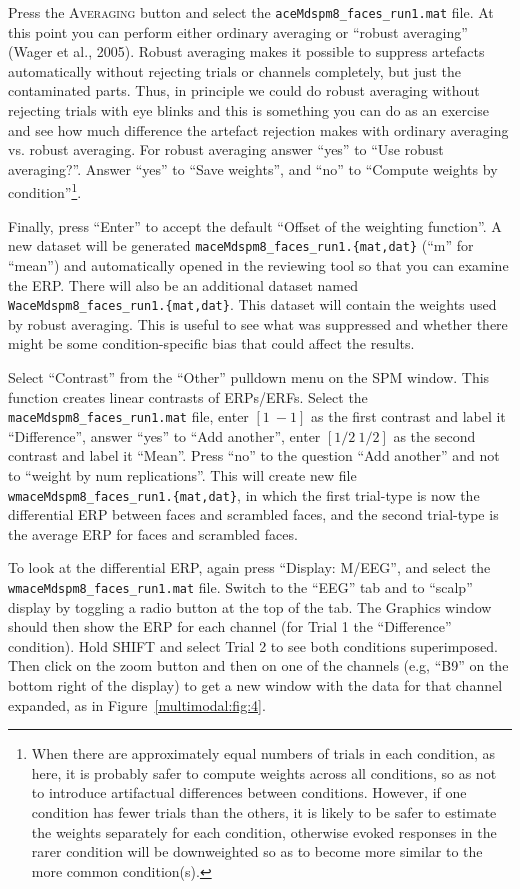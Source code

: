 Press the \textsc{Averaging} button and select the \texttt{aceMdspm8\_faces\_run1.mat} file. At this point you can perform either ordinary averaging or ``robust averaging'' (Wager et al., 2005). Robust averaging makes it possible to suppress artefacts automatically without rejecting trials or channels completely, but just the contaminated parts. Thus, in principle we could do robust averaging without rejecting trials with eye blinks and this is something you can do as an exercise and see how much difference the artefact rejection makes with ordinary averaging vs. robust averaging. For robust averaging answer ``yes'' to ``Use robust averaging?''. Answer ``yes'' to ``Save weights'', and ``no'' to ``Compute weights by condition''\footnote{When there are approximately equal numbers of trials in each condition, as here, it is probably safer to compute weights across all conditions, so as not to introduce artifactual differences between conditions. However, if one condition has fewer trials than the others, it is likely to be safer to estimate the weights separately for each condition, otherwise evoked responses in the rarer condition will be downweighted so as to become more similar to the more common condition(s).}.

Finally, press ``Enter'' to accept the default ``Offset of the weighting function''. A new dataset will be generated \texttt{maceMdspm8\_faces\_run1.\{mat,dat\}} (``m'' for ``mean'') and automatically opened in the reviewing tool so that you can examine the ERP. There will also be an additional dataset named \texttt{WaceMdspm8\_faces\_run1.\{mat,dat\}}. This dataset will contain the weights used by robust averaging. This is useful to see what was suppressed and whether there might be some condition-specific bias that could affect the results.

Select ``Contrast'' from the ``Other'' pulldown menu on the SPM window. This function creates linear contrasts of ERPs/ERFs. Select the \texttt{maceMdspm8\_\-faces\_\-run1.mat} file,  enter $[1\: -1]$ as the first contrast and label it ``Difference'', answer ``yes'' to ``Add another'',  enter $[1/2\: 1/2]$ as the second contrast and label it ``Mean''. Press ``no'' to the question ``Add another'' and not to ``weight by num replications''. This will create new file \texttt{wmaceMdspm8\_faces\_run1.\{mat,dat\}}, in which the first trial-type is now the differential ERP between faces and scrambled faces, and the second trial-type is the average ERP for faces and scrambled faces.

To look at the differential ERP, again press ``Display: M/EEG'', and select the \texttt{wmaceMdspm8\_faces\_run1.mat} file. Switch to the ``EEG'' tab and to ``scalp'' display by toggling a radio button at the top of the tab. The Graphics window should then show the ERP for each channel (for Trial 1 the ``Difference'' condition). Hold SHIFT and select Trial 2 to see both conditions superimposed. Then click on the zoom button and then on one of the channels (e.g, ``B9'' on the bottom right of the display) to get a new window with the data for that channel expanded, as in Figure~\ref{multimodal:fig:4}.


